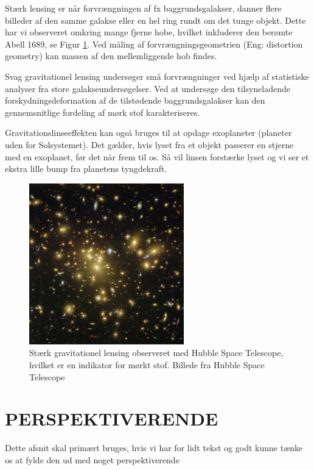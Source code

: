 Stærk lensing er når forvrængningen af fx baggrundsgalakser, danner flere billeder af den samme galakse eller en hel ring rundt om det tunge objekt. Dette har vi observeret omkring mange fjerne hobe, hvilket inkluderer den berømte Abell 1689, se Figur \ref{abell1689}. Ved måling af forvrængningsgeometrien (Eng: distortion geometry) kan massen af den mellemliggende hob findes. %

Svag gravitationel lensing undersøger små forvrængninger ved hjælp af statistiske analyser fra store galakseundersøgelser. Ved at undersøge den tilsyneladende forskydningsdeformation af de tilstødende baggrundsgalakser kan den gennemsnitlige fordeling af mørk stof karakteriseres.

Gravitationslinseeffekten kan også bruges til at opdage exoplaneter (planeter uden for Solsystemet). Det gælder, hvis lyset fra et objekt passerer en stjerne med en exoplanet, før det når frem til os. Så vil linsen forstærke lyset og vi ser et ekstra lille bump fra planetens tyngdekraft.

\begin{figure}[h!]
	\centering
	\includegraphics[width=0.6\textwidth]{Astrofysik/Astrofig/abell1689.jpg}
	\caption{Stærk gravitationel lensing observeret med Hubble Space Telescope, hvilket er en indikator for mørkt stof. Billede fra Hubble Space Telescope}
	\label{abell1689}
\end{figure}

\section{PERSPEKTIVERENDE}
Dette afsnit skal primært bruges, hvis vi har for lidt tekst og godt kunne tænke os at fylde den ud med noget perspektiverende 